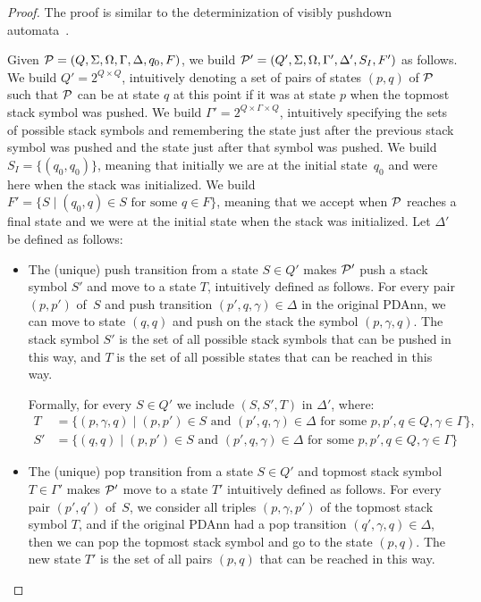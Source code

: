 \begin{proof}
  The proof is similar to the determinization of visibly pushdown
  automata~\cite[Lemma~1]{icdt2020nested}.

  Given $\mathcal{P} = (Q, \Sigma, \Omega, \Gamma, \Delta, q_0, F)$,
        we build $\mathcal{P}' = (Q', \Sigma, \Omega, \Gamma', \Delta', S_I, F')$ as
        follows.
	We build $Q' = 2^{Q\times Q}$, intuitively denoting a set of pairs of
        states $(p, q)$ of $\mathcal{P}$ such that $\mathcal{P}$ can be at state $q$ at this
        point if it was at state $p$ when the topmost stack symbol was pushed. 
        We build $\Gamma' = 2^{Q\times\Gamma\times Q}$,
        intuitively specifying the sets of possible stack symbols and
        remembering the state just after the previous stack symbol was pushed
        and the state just after that symbol was pushed.
	We build $S_I = \{(q_0,q_0)\}$, meaning that initially we are at
        the initial state~$q_0$ and were here when the stack was initialized.
        We build
        $F' = \{S\mid (q_0,q)\in S\text{ for some }q\in F \}$,
        meaning that we accept when $\mathcal{P}$ reaches a final
        state and we were at the initial state when the stack was initialized.
	Let $\Delta'$ be defined as follows:
	\begin{itemize}
          \item The (unique) push transition from a state $S \in Q'$ 
                  makes $\mathcal{P}'$ push a stack symbol $S'$ and move to a state $T$,
                  intuitively defined as follows. For every pair $(p, p')$
                  of~$S$ and push transition $(p', q, \gamma) \in \Delta$ in the original PDAnn,
                  we can move to state $(q, q)$ and push on the stack the symbol
                  $(p, \gamma, q)$. The stack symbol $S'$ is the set of all
                  possible stack symbols that can be pushed in this way, and
                  $T$ is the set of all possible states that can be reached in
                  this way.

                  Formally, 
                  for every $S\in Q'$ we include $(S, S', T)$ in $\Delta'$, where:
		\begin{align*}
			T &= \{(p,\gamma,q)\mid (p,p')\in S \text{ and } (p',q,\gamma)\in\Delta\text{ for some }p,p',q\in Q, \gamma\in\Gamma \},\\
			S'&= \{(q,q)\mid(p,p')\in S\text{ and }(p',q,\gamma)\in\Delta\text{ for some }p,p',q\in Q,  \gamma\in\Gamma\}
		\end{align*}
              \item The (unique) pop transition from a state $S \in Q'$ and topmost
                stack symbol $T \in \Gamma'$ makes $\mathcal{P}'$ move to a state $T'$
                intuitively defined as follows. For every pair $(p', q')$ of~$S$,
                we consider all triples $(p, \gamma, p')$ of the topmost stack
                symbol $T$, and if the original PDAnn had a pop transition $(q',
                \gamma, q) \in \Delta$, then we can pop the topmost stack symbol
                and go to the state $(p, q)$. The new state $T'$ is the set of
                all pairs $(p, q)$ that can be reached in this way.


\end{itemize}
\end{proof}
